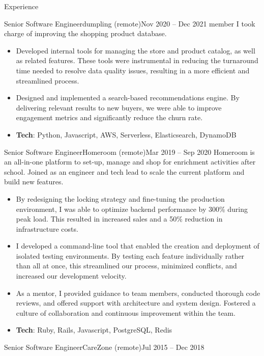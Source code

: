 \documentclass[colibri]{mcdowellcv}
\begin{document}
\begin{cvsection}{Experience}
\begin{cvsubsection}{Senior Software Engineer}{dumpling (remote)}{Nov 2020 -- Dec 2021}
    member I took charge of improving the shopping product database.
		\begin{itemize}
    \item
      Developed internal tools for managing the store and product catalog, as
      well as related features. These tools were instrumental in reducing the
      turnaround time needed to resolve data quality issues, resulting in a more
      efficient and streamlined process.
    \item
      Designed and implemented a search-based recommendations engine. By
      delivering relevant results to new buyers, we were able to improve
      engagement metrics and significantly reduce the churn rate.
    \item \textbf{Tech}: Python, Javascript, AWS, Serverless, Elasticsearch, DynamoDB
		\end{itemize}
	\end{cvsubsection}
	\begin{cvsubsection}{Senior Software Engineer}{Homeroom (remote)}{Mar 2019 -- Sep 2020}
    Homeroom is an all-in-one platform to set-up, manage and shop for enrichment
    activities after school. Joined as an engineer and tech lead to scale the
    current platform and build new features.
		\begin{itemize}
    \item
      By redesigning the locking strategy and fine-tuning the production
      environment, I was able to optimize backend performance by 300\% during
      peak load. This resulted in increased sales and a 50\% reduction in
      infrastructure costs.
    \item I developed a command-line tool that enabled the creation and
      deployment of isolated testing environments. By testing each feature
      individually rather than all at once, this streamlined our process,
      minimized conflicts, and increased our development velocity.
    \item As a mentor, I provided guidance to team members, conducted thorough
      code reviews, and offered support with architecture and system
      design. Fostered a culture of collaboration and continuous improvement
      within the team.
    \item \textbf{Tech}: Ruby, Rails, Javascript, PostgreSQL, Redis
		\end{itemize}
	\end{cvsubsection}
	\begin{cvsubsection}{Senior Software Engineer}{CareZone (remote)}{Jul 2015 -- Dec 2018}

\end{cvsubsection}
\end{cvsection}
\end{document}

